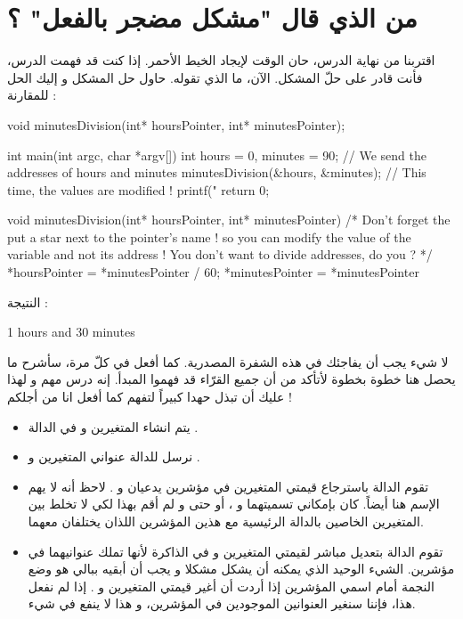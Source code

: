 \section{من الذي قال "مشكل مضجر بالفعل" ؟}
اقتربنا من نهاية الدرس، حان الوقت لإيجاد الخيط الأحمر. إذا كنت قد فهمت الدرس، فأنت قادر على حلّ المشكل. الآن، ما الذي تقوله. حاول حل المشكل و إليك الحل للمقارنة :
\begin{Csource}
void minutesDivision(int* hoursPointer, int* minutesPointer);

int main(int argc, char *argv[])
{
	int hours = 0, minutes = 90;
	// We send the addresses of hours and minutes
	minutesDivision(&hours, &minutes);
	// This time, the values are modified !
	printf("%
	return 0;
}

void minutesDivision(int* hoursPointer, int* minutesPointer)
{
	/* Don’t forget the put a star next to the pointer’s name ! so you can modify the value of the variable and not its address ! You don’t want to divide addresses, do you ? */
	*hoursPointer = *minutesPointer / 60;
	*minutesPointer = *minutesPointer %
}
\end{Csource}
النتيجة :
\begin{Csource}
1 hours and 30 minutes
\end{Csource}
لا شيء يجب أن يفاجئك في هذه الشفرة المصدرية. كما أفعل في كلّ مرة، سأشرح ما يحصل هنا خطوة بخطوة لأتأكد من أن جميع القرّاء قد فهموا المبدأ. إنه درس مهم و لهذا عليك أن تبذل حهدا كبيراً لتفهم كما أفعل انا من أجلكم !
\begin{itemize}
	\item يتم انشاء المتغيرين
و
في الدالة
.
	\item نرسل للدالة
عنواني المتغيرين
و
.
	\item تقوم الدالة
باسترجاع قيمتي المتغيرين في مؤشرين يدعيان
و
.
لاحظ أنه لا يهم الإسم هنا أيضاً. كان بإمكاني تسميتهما
و
،
أو حتى
و
لم أقم بهذا لكي لا تخلط بين المتغيرين الخاصين بالدالة الرئيسية مع هذين المؤشرين اللذان يختلفان معهما.
	\item تقوم الدالة
بتعديل مباشر لقيمتي المتغيرين
و
في الذاكرة لأنها تملك عنوانيهما في مؤشرين. الشيء الوحيد الذي يمكنه أن يشكل مشكلا و يجب أن أبقيه ببالي هو وضع النجمة أمام اسمي المؤشرين إذا أردت أن أغير قيمتي المتغيرين
و
.
إذا لم نفعل هذا، فإننا سنغير العنوانين الموجودين في المؤشرين، و هذا لا ينفع في شيء.
\end{itemize}
